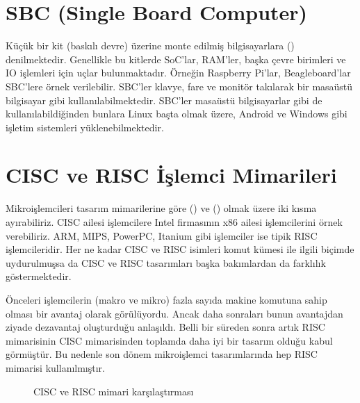 \documentclass[letterpaper,10pt,turkish]{sphinxmanual}
\begin{document}
\section{SBC (Single Board Computer)}
\label{\detokenize{introduction:sbc-single-board-computer}}
\sphinxAtStartPar
Küçük bir kit (baskılı devre) üzerine monte edilmiş bilgisayarlara  ()
denilmektedir. Genellikle bu kitlerde SoC’lar, RAM’ler, başka çevre birimleri ve IO işlemleri için
uçlar bulunmaktadır. Örneğin Raspberry Pi’lar, Beagleboard’lar SBC’lere örnek verilebilir.
SBC’ler klavye, fare ve monitör takılarak bir masaüstü bilgisayar gibi kullanılabilmektedir.
SBC’ler masaüstü bilgisayarlar gibi de kullanılabildiğinden bunlara Linux başta olmak üzere,
Android ve Windows gibi işletim sistemleri yüklenebilmektedir.


\section{CISC ve RISC İşlemci Mimarileri}
\label{\detokenize{introduction:cisc-ve-risc-islemci-mimarileri}}
\sphinxAtStartPar
Mikroişlemcileri tasarım mimarilerine göre  () ve
 () olmak üzere iki kısma ayırabiliriz. CISC ailesi
işlemcilere Intel firmasının x86 ailesi işlemcilerini örnek verebiliriz. ARM, MIPS, PowerPC,
Itanium gibi işlemciler ise tipik RISC işlemcileridir. Her ne kadar CISC ve RISC isimleri komut
kümesi ile ilgili biçimde uydurulmuşsa da CISC ve RISC tasarımları başka bakımlardan da
farklılık göstermektedir.

\sphinxAtStartPar
Önceleri işlemcilerin (makro ve mikro) fazla sayıda makine komutuna sahip olması bir avantaj
olarak görülüyordu. Ancak daha sonraları bunun avantajdan ziyade dezavantaj oluşturduğu anlaşıldı.
Belli bir süreden sonra artık RISC mimarisinin CISC mimarisinden toplamda daha iyi bir tasarım
olduğu kabul görmüştür. Bu nedenle son dönem mikroişlemci tasarımlarında hep RISC mimarisi
kullanılmıştır.

\begin{figure}[htbp]
\centering
\capstart

\noindent{}
\caption{CISC ve RISC mimari karşılaştırması}\label{\detokenize{introduction:id3}}\end{figure}
\end{document}
